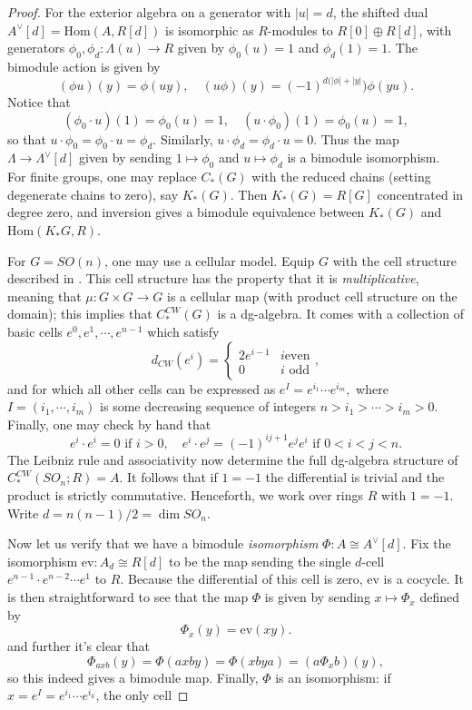 \documentclass{memo-l}
\theoremstyle{definition}
\theoremstyle{remark}
\numberwithin{section}{chapter}
\numberwithin{equation}{chapter}
\begin{document}
\begin{proof}
For the exterior algebra on a generator with $|u| = d$, the shifted dual $A^\vee[d] = \text{Hom}(A, R[d])$ is isomorphic as $R$-modules to $R[0] \oplus R[d]$, with generators $\phi_0, \phi_d: \Lambda(u) \to R$ given by $\phi_0(u) = 1$ and $\phi_d(1) = 1$. The bimodule action is given by $$(\phi u)(y) = \phi(uy), \quad (u \phi)(y) = (-1)^{d(|\phi|+|y|}) \phi(yu).$$ Notice that $$(\phi_0 \cdot u)(1) = \phi_0(u) = 1, \quad (u \cdot \phi_0)(1) = \phi_0(u) = 1,$$ so that $u \cdot \phi_0 = \phi_0 \cdot u = \phi_d$. Similarly, $u \cdot \phi_d = \phi_d \cdot u = 0$. Thus the map $\Lambda \to \Lambda^\vee[d]$ given by sending $1 \mapsto \phi_0$ and $u \mapsto \phi_d$ is a bimodule isomorphism. \\

For finite groups, one may replace $C_*(G)$ with the reduced chains (setting degenerate chains to zero), say $K_*(G)$. Then $K_*(G) = R[G]$ concentrated in degree zero, and inversion gives a bimodule equivalence between $K_*(G)$ and $\text{Hom}(K_* G, R)$. 

For $G = SO(n)$, one may use a cellular model. Equip $G$ with the cell structure described in \cite[Chapter 3.D]{Hatcher}. This cell structure has the property that it is \emph{multiplicative}, meaning that $\mu: G \times G \to G$ is a cellular map (with product cell structure on the domain); this implies that $C_*^{CW}(G)$ is a dg-algebra. It comes with a collection of basic cells $e^0, e^1, \cdots, e^{n-1}$ which satisfy $$d_{CW}(e^i) = \begin{cases} 2e^{i-1} & i \text{even} \\ 0 & i \text{ odd}\end{cases},$$ and for which all other cells can be expressed as $e^I = e^{i_1} \cdots e^{i_m},$ where $I = (i_1, \cdots, i_m)$ is some decreasing sequence of integers $n > i_1 > \cdots > i_m > 0$. Finally, one may check by hand that $$e^i \cdot e^i = 0 \text{ if } i > 0, \quad e^i \cdot e^j = (-1)^{ij+1} e^j e^i \text{ if } 0 < i < j < n.$$ The Leibniz rule and associativity now determine the full dg-algebra structure of $C_*^{CW}(SO_n;R) = A$. It follows that if $1 = -1$ the differential is trivial and the product is strictly commutative. Henceforth, we work over rings $R$ with $1 = -1$. Write $d = n(n-1)/2 = \dim SO_n$. 

Now let us verify that we have a bimodule \emph{isomorphism} $\Phi: A \cong A^\vee[d]$. Fix the isomorphism $\text{ev}: A_d \cong R[d]$ to be the map sending the single $d$-cell $e^{n-1} \cdot e^{n-2} \cdots e^1$ to $R$. Because the differential of this cell is zero, $\text{ev}$ is a cocycle. It is then straightforward to see that the map $\Phi$ is given by sending $x \mapsto \Phi_x$ defined by $$\Phi_x(y) = \text{ev}(xy).$$ and further it's clear that $$\Phi_{axb}(y) = \Phi(axby) = \Phi(xbya) = (a \Phi_x b)(y),$$ so this indeed gives a bimodule map. Finally, $\Phi$ is an isomorphism: if $x = e^I = e^{i_1} \cdots e^{i_k}$, the only cell 


\end{proof}
\end{document}
